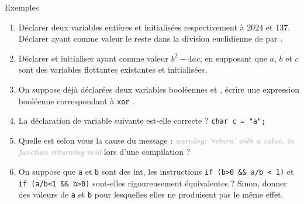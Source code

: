 \documentclass[10pt]{beamer}
\begin{document}
\begin{frame}{\Ctitle}{\stitle}
	\begin{exampleblock}{Exemples}
		\begin{enumerate}
		\item<1-> Déclarer deux variables entières  et  initialisées respectivement à 2024 et 137. Déclarer  ayant comme valeur le reste dans la division euclidienne de  par .
		\item<2-> Déclarer et initialiser  ayant comme valeur $b^2 - 4ac$, en supposant que $a$, $b$ et $c$ sont des variables flottantes existantes et initialisées.
		\item<3-> On suppose déjà déclarées deux variables booléennes  et , écrire une expression booléenne correspondant à  {\tt xor} . 
		\item<4-> La déclaration de variable suivante est-elle correcte ? \texttt{char c = "a";} 
		\item<5-> Quelle est selon vous la cause du message : \textit{\textcolor{darkgray}{warning: ‘return’ with a value, in function returning void}} lors d'une compilation ?
		\item<6-> On suppose que {\tt a} et {\tt b} sont des {\kw int}, les instructions \texttt{if (b>0 && a/b < 1)} et \texttt{if (a/b<1 && b>0)} sont-elles rigoureusement équivalentes ? Sinon, donner des valeurs de {\tt a} et {\tt b} pour lesquelles elles ne produisent pas le même effet.
	\end{enumerate}
	\end{exampleblock}
\end{frame}
\end{document}

